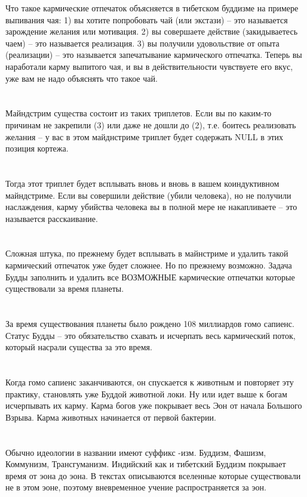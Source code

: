 Что такое кармические отпечаток объясняется в тибетском буддизме на примере выпивания чая: 1) вы хотите попробовать чай (или экстази) -- это называется зарождение желания или мотивация. 2) вы совершаете действие (закидываетесь чаем) -- это называется реализация. 3) вы получили удовольствие от опыта (реализации) -- это называется запечатывание кармического отпечатка. Теперь вы наработали карму выпитого чая, и вы в действительности чувствуете его вкус, уже вам не надо объяснять что такое чай.\\
\\
\\
Майндстрим существа состоит из таких триплетов. Если вы по каким-то причинам не закрепили (3) или даже не дошли до (2), т.е. боитесь реализовать желания -- у вас в этом майднстриме триплет будет содержать NULL в этих позиция кортежа.\\
\\
\\
Тогда этот триплет будет всплывать вновь и вновь в вашем коиндуктивном майндстриме. Если вы совершили действие (убили человека), но не получили наслаждения, карму убийства человека вы в полной мере не накапливаете -- это называется расскаивание.\\
\\
\\
Сложная штука, по прежнему будет всплывать в майнстриме и удалить такой кармический отпечаток уже будет сложнее. Но по прежнему возможно. Задача Будды заполнить и удалить все ВОЗМОЖНЫЕ кармические отпечатки которые существовали за время планеты.\\
\\
\\
За время существования планеты было рождено 108 миллиардов гомо сапиенс. Статус Будды -- это обязательство схавать и исчерпать весь кармический поток, который насрали существа за это время.\\
\\
\\
Когда гомо сапиенс заканчиваются, он спускается к животным и повторяет эту практику, становлять уже Буддой животной локи. Ну или идет выше к богам исчерпывать их карму. Карма богов уже покрывает весь Эон от начала Большого Взрыва. Карма животных начинается от первой бактерии.\\
\\
\\
Обычно идеологии в названии имеют суффикс -изм. Буддизм, Фашизм, Коммунизм, Трансгуманизм. Индийский как и тибетский Буддизм покрывает время от эона до эона. В текстах описываются вселенные которые существовали не в этом эоне, поэтому вневременное учение распространяется за эон.\\
